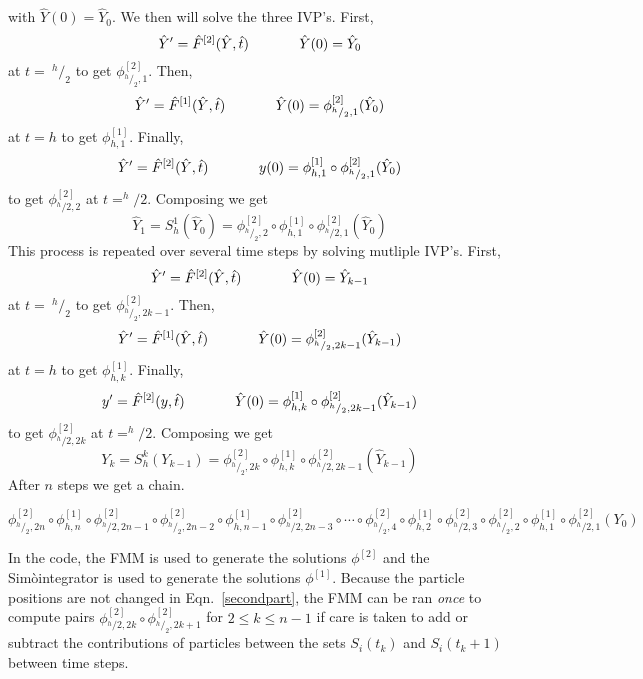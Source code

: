 \documentclass[oneside,12pt]{book}
\newcommand{\Simo}{Sim\`{o}}
\begin{document}
with $\hat{Y}(0)=\hat{Y}_0$.  We then will solve the three IVP's.  First,
\[\hat{Y}'=\hat{F}^{[2]}(\hat{Y},\hat{t}) \hspace{0.5in} \hat{Y}(0)=\hat{Y}_0\]
at $t= \ ^h\slash_2$ to get $\phi^{[2]}_{^h \slash _2 ,1}$.  Then,
\[\hat{Y}'=\hat{F}^{[1]}(\hat{Y},\hat{t}) \hspace{0.5in} \hat{Y}(0)=\phi^{[2]}_{^h \slash _2,1}(\hat{Y}_0)\]
at $t= h$ to get $\phi^{[1]}_{h,1}$.  Finally,
\[\hat{Y}'=\hat{F}^{[2]}(\hat{Y},\hat{t}) \hspace{0.5in} y(0)=\phi^{[1]}_{h,1} \circ \phi^{[2]}_{^h \slash _2,1}(\hat{Y}_0)\]
to get $\phi^{[2]}_{^h \slash 2,2}$ at $t=^h \slash 2$.  Composing we get
$$\hat{Y}_1=S^1_h(\hat{Y}_0)=\phi^{[2]}_{^h\slash_2,2} \circ \phi^{[1]}_{h,1} \circ \phi^{[2]}_{^h \slash 2,1}(\hat{Y}_0)$$
This process is repeated over several time steps by solving mutliple IVP's.
First,
\[\hat{Y}'=\hat{F}^{[2]}(\hat{Y},\hat{t}) \hspace{0.5in} \hat{Y}(0)=\hat{Y}_{k-1}\]
at $t= \ ^h\slash_2$ to get $\phi^{[2]}_{^h \slash _2 ,2k-1}$.  Then,
\[\hat{Y}'=\hat{F}^{[1]}(\hat{Y},\hat{t}) \hspace{0.5in} \hat{Y}(0)=\phi^{[2]}_{^h \slash _2,2k-1}(\hat{Y}_{k-1})\]
at $t= h$ to get $\phi^{[1]}_{h,k}$.  Finally,
\[y'=\hat{F}^{[2]}(y,\hat{t}) \hspace{0.5in} \hat{Y}(0)=\phi^{[1]}_{h,k} \circ \phi^{[2]}_{^h \slash _2,2k-1}(\hat{Y}_{k-1})\]
to get $\phi^{[2]}_{^h \slash 2,2k}$ at $t=^h \slash 2$.  Composing we get
$$Y_k=S^k_h(Y_{k-1})=\phi^{[2]}_{^h\slash_2,2k} \circ \phi^{[1]}_{h,k} \circ \phi^{[2]}_{^h \slash 2,2k-1}(\hat{Y}_{k-1})$$
After $n$ steps we get a chain.
\begin{footnotesize}
\begin{equation}
\phi^{[2]}_{^h\slash_2,2n} \circ \phi^{[1]}_{h,n} \circ \phi^{[2]}_{^h \slash 2,2n-1} \circ 
\phi^{[2]}_{^h\slash_2,2n-2} \circ \phi^{[1]}_{h,n-1} \circ \phi^{[2]}_{^h \slash 2,2n-3} \circ \cdots \circ \phi^{[2]}_{^h\slash_2,4} \circ \phi^{[1]}_{h,2} \circ \phi^{[2]}_{^h \slash 2,3} \circ \phi^{[2]}_{^h\slash_2,2} \circ \phi^{[1]}_{h,1} \circ \phi^{[2]}_{^h \slash 2,1}(Y_0)
\label{bigstrang}
\end{equation}
\end{footnotesize}
In the code, the FMM is used to generate the solutions $\phi^{[2]}$ and the \Simo integrator is used to generate the solutions $\phi^{[1]}$.  Because the particle positions are not changed in Eqn.\ \ref{secondpart}, the FMM can be ran \emph{once} to compute pairs $\phi^{[2]}_{^h \slash 2,2k} \circ \phi^{[2]}_{^h\slash_2,2k+1}$ for $2 \leq k \leq n-1$ if care is taken to add or subtract the contributions of particles between the sets $S_i(t_k)$ and $S_i(t_k+1)$ between time steps.
\end{document}

